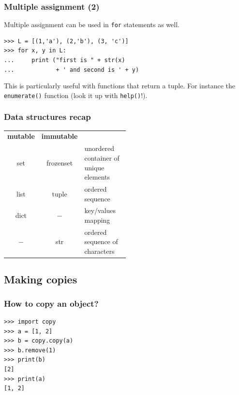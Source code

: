 \documentclass[english,serif,mathserif,xcolor=pdftex,dvipsnames,table]{beamer}
\begin{document}
\begin{frame}[fragile]
\frametitle{Multiple assignment (2)}
Multiple assignment can be used in \texttt{for} statements as well.
\begin{lstlisting}
>>> L = [(1,'a'), (2,'b'), (3, 'c')]
>>> for x, y in L:
...     print ("first is " + str(x)
...            + ' and second is ' + y)
\end{lstlisting}

  \+
  This is particularly useful with functions that return a tuple.
  For instance the \texttt{enumerate()} function (look it up with
  \texttt{help()}!).
\end{frame}



\begin{frame}
  \frametitle{Data structures recap}
  \begin{center}
    \begin{tabular}{>{\ttfamily}c|>{\ttfamily}c|>{\footnotesize}p{0.5\linewidth}}
      \rmfamily \textbf{mutable} & \rmfamily \textbf{immutable} & \\
      set & frozenset & unordered container of
      unique elements\\[1ex]
      list & tuple & ordered sequence\\[1ex]
      dict & $-$ & key/values mapping\\[1ex]
      $-$& str & ordered sequence of characters\\
    \end{tabular}
  \end{center}
\end{frame}







\subsection{Making copies}

\begin{frame}[fragile]
  \frametitle{How to copy an object?}
  \begin{lstlisting}
>>> import copy
>>> a = [1, 2]
>>> b = copy.copy(a)
>>> b.remove(1)
>>> print(b)
[2]
>>> print(a)
[1, 2]
  \end{lstlisting}
\end{frame}
\end{document}
